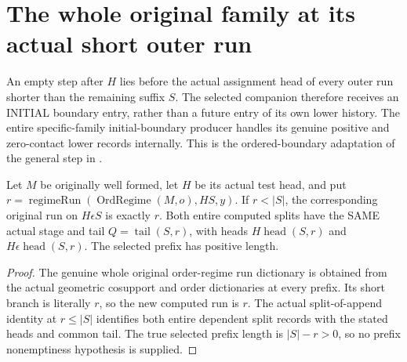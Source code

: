 \section{The whole original family at its actual short outer run}

An empty step after $H$ lies before the actual assignment head of every
outer run shorter than the remaining suffix $S$. The selected companion
therefore receives an INITIAL boundary entry, rather than a future entry of
its own lower history. The entire specific-family initial-boundary producer
handles its genuine positive and zero-contact lower records internally.
This is the ordered-boundary adaptation of the general step in
\cite{wlodarczyk05-hironaka,bierstone-milman08-functoriality}.

\begin{lemma}
\label{hir:original-general-actual-short-splits}
\leanok
Let $M$ be originally well formed, let $H$ be its actual test head, and put
$r=\operatorname{regimeRun}(\operatorname{OrdRegime}(M,o),HS,y)$.
If $r<|S|$, the corresponding original run on $H\epsilon S$ is exactly $r$.
Both entire computed splits have the SAME actual stage and tail
$Q=\operatorname{tail}(S,r)$, with heads $H\operatorname{head}(S,r)$ and
$H\epsilon\operatorname{head}(S,r)$. The selected prefix has positive length.
\end{lemma}
\begin{proof}
The genuine whole original order-regime run dictionary is obtained from the
actual geometric cosupport and order dictionaries at every prefix. Its
short branch is literally $r$, so the new computed run is $r$. The actual
split-of-append identity at $r\leq |S|$ identifies both entire dependent split
records with the stated heads and common tail. The true selected prefix
length is $|S|-r>0$, so no prefix nonemptiness hypothesis is supplied.
\end{proof}

